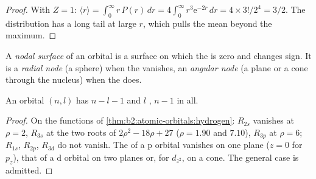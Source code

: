 \begin{proof}
With $Z = 1$: $\langle r\rangle = \int_0^\infty r\,P(r)\,dr = 4\int_0^\infty r^3\mathrm e^{-2r}
\,dr = 4 \times 3!/2^4 = 3/2$. The distribution has a long tail at large $r$,
which pulls the mean beyond the maximum.
\end{proof}

\begin{definition}[Nodes]\label{def:b2:atomic-orbitals:node}
A \emph{nodal surface} of an orbital is a surface on which
the  is zero and changes sign. It is a \emph{radial node}
(a sphere) when the  vanishes, an \emph{angular
node} (a plane or a cone through the nucleus) when the 
does.
\end{definition}

\begin{proposition}\label{prop:b2:atomic-orbitals:nodes}
An orbital $(n, l)$ has $n - l - 1$  and $l$ , $n - 1$ in
all.
\end{proposition}

\begin{proof}
On the functions of \cref{thm:b2:atomic-orbitals:hydrogen}: $R_{2s}$ vanishes at
$\rho = 2$, $R_{3s}$ at the two roots of $2\rho^2 - 18\rho + 27$ ($\rho = 1.90$ and $7.10$),
$R_{3p}$ at $\rho = 6$; $R_{1s}$, $R_{2p}$, $R_{3d}$ do not vanish. The 
of a p orbital vanishes on one plane ($z = 0$ for $p_z$), that of a d orbital on two
planes or, for $d_{z^2}$, on a cone. The general case is admitted.
\end{proof}

